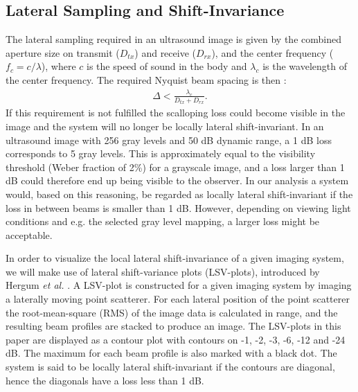\documentclass[journal]{IEEEtran}
\newcommand{\mat}[1]{\mathbf{#1}}
\renewcommand{\vec}[1]{\mathbf{#1}}
\begin{document}

\subsection{Lateral Sampling and Shift-Invariance}

The lateral sampling required in an ultrasound image is given by the combined aperture size on transmit ($D_{tx}$) and receive ($D_{rx}$), and the center frequency ($f_c = c/\lambda$), where $c$ is the speed of sound in the body and $\lambda_c$ is the wavelength of the center frequency. The required Nyquist beam spacing is then \cite{Hergum2007}:
\begin{align}
\Delta < \frac{\lambda_c}{D_{tx} + D_{rx}}. \label{eq:resolution}
\end{align}
If this requirement is not fulfilled the scalloping loss could become visible in the image and the system will no longer be locally lateral shift-invariant. In an ultrasound image with 256 gray levels and 50 dB dynamic range, a 1 dB loss corresponds to 5 gray levels. This is approximately equal to the visibility threshold (Weber fraction of 2\%) for a grayscale image, and a loss larger than 1 dB could therefore end up being visible to the observer. In our analysis a system would, based on this reasoning, be regarded as locally lateral shift-invariant if the loss in between beams is smaller than 1 dB. However, depending on viewing light conditions and e.g. the selected gray level mapping, a larger loss might be acceptable.

In order to visualize the local lateral shift-invariance of a given imaging system, we will make use of lateral shift-variance plots (LSV-plots), introduced by Hergum \textit{et al.} \cite{Hergum2007}. A LSV-plot is constructed for a given imaging system by imaging a laterally moving point scatterer. For each lateral position of the point scatterer the root-mean-square (RMS) of the image data is calculated in range, and the resulting beam profiles are stacked to produce an image. The LSV-plots in this paper are displayed as a contour plot with contours on -1, -2, -3, -6, -12 and -24 dB. The maximum for each beam profile is also marked with a black dot. The system is said to be locally lateral shift-invariant if the contours are diagonal, hence the diagonals have a loss less than 1 dB.
\end{document}
